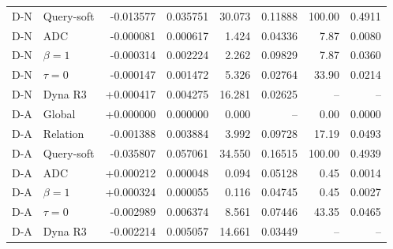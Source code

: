 \begin{table}[htbp]
\begin{tabular}{llrrrrrr}
D-N & Query-soft & -0.013577 & 0.035751 & 30.073 & 0.11888 & 100.00 & 0.4911\\
D-N & ADC & -0.000081 & 0.000617 & 1.424 & 0.04336 & 7.87 & 0.0080\\
D-N & $\beta=1$ & -0.000314 & 0.002224 & 2.262 & 0.09829 & 7.87 & 0.0360\\
D-N & $\tau=0$ & -0.000147 & 0.001472 & 5.326 & 0.02764 & 33.90 & 0.0214\\
D-N & Dyna R3 & +0.000417 & 0.004275 & 16.281 & 0.02625 & -- & --\\
\midrule
D-A & Global & +0.000000 & 0.000000 & 0.000 & -- & 0.00 & 0.0000\\
D-A & Relation & -0.001388 & 0.003884 & 3.992 & 0.09728 & 17.19 & 0.0493\\
D-A & Query-soft & -0.035807 & 0.057061 & 34.550 & 0.16515 & 100.00 & 0.4939\\
D-A & ADC & +0.000212 & 0.000048 & 0.094 & 0.05128 & 0.45 & 0.0014\\
D-A & $\beta=1$ & +0.000324 & 0.000055 & 0.116 & 0.04745 & 0.45 & 0.0027\\
D-A & $\tau=0$ & -0.002989 & 0.006374 & 8.561 & 0.07446 & 43.35 & 0.0465\\
D-A & Dyna R3 & -0.002214 & 0.005057 & 14.661 & 0.03449 & -- & --\\
\bottomrule
\end{tabular}
\end{table}

